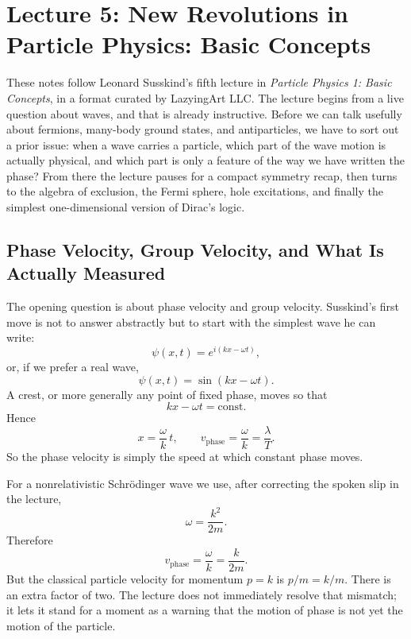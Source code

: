\chapter{Lecture 5: New Revolutions in Particle Physics: Basic Concepts}

These notes follow Leonard Susskind's fifth lecture in \emph{Particle Physics 1: Basic Concepts}, in a format curated by LazyingArt LLC. The lecture begins from a live question about waves, and that is already instructive. Before we can talk usefully about fermions, many-body ground states, and antiparticles, we have to sort out a prior issue: when a wave carries a particle, which part of the wave motion is actually physical, and which part is only a feature of the way we have written the phase? From there the lecture pauses for a compact symmetry recap, then turns to the algebra of exclusion, the Fermi sphere, hole excitations, and finally the simplest one-dimensional version of Dirac's logic.

\section{Phase Velocity, Group Velocity, and What Is Actually Measured}

The opening question is about phase velocity and group velocity. Susskind's first move is not to answer abstractly but to start with the simplest wave he can write:
\begin{equation}
\psi(x,t)=e^{i(kx-\omega t)},
\end{equation}
or, if we prefer a real wave,
\begin{equation}
\psi(x,t)=\sin(kx-\omega t).
\end{equation}
A crest, or more generally any point of fixed phase, moves so that
\begin{equation}
kx-\omega t=\text{const.}
\end{equation}
Hence
\begin{equation}
x=\frac{\omega}{k}\,t,
\qquad
v_{\mathrm{phase}}=\frac{\omega}{k}=\frac{\lambda}{T}.
\end{equation}
So the phase velocity is simply the speed at which constant phase moves.

For a nonrelativistic Schr\"odinger wave we use, after correcting the spoken slip in the lecture,
\begin{equation}
\omega=\frac{k^2}{2m}.
\end{equation}
Therefore
\begin{equation}
v_{\mathrm{phase}}=\frac{\omega}{k}=\frac{k}{2m}.
\end{equation}
But the classical particle velocity for momentum \(p=k\) is \(p/m=k/m\). There is an extra factor of two. The lecture does not immediately resolve that mismatch; it lets it stand for a moment as a warning that the motion of phase is not yet the motion of the particle.


